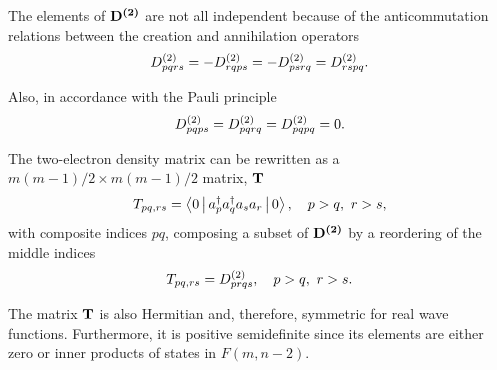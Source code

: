 The elements of $ \boldsymbol{\mathrm{D^{\left( 2 \right)}}}$ are not all independent because of the
anticommutation relations between the creation and annihilation operators 
\begin{equation}
    D^{\left( 2 \right)}_{pqrs} = - D^{\left( 2 \right)}_{rqps} = - D^{\left( 2 \right)}_{ps rq} = D^{\left( 2 \right)}_{rspq}
    .
\end{equation}

Also, in accordance with the Pauli principle 
\begin{equation}
    D^{\left( 2 \right)}_{pqps} = D^{\left( 2 \right)}_{pqrq} = D^{\left( 2 \right)}_{pqpq} = 0
    .
\end{equation}

The two-electron density matrix can be rewritten as a
$m\left( m-1 \right) /2 \times m\left( m-1 \right) /2$ 
matrix, $ \boldsymbol{\mathrm{T}}$ 
\begin{equation}
    T_{pq,rs} = \Braket{0 | a_p^{\dagger} a_q^{\dagger} a_s a_r | 0}
    , \quad
    p>q,\ r>s
    ,
\end{equation}
with composite indices $pq$, composing a subset of $ \boldsymbol{\mathrm{D^{\left( 2 \right)}}}$ by a
reordering of the middle indices 
\begin{equation}
    T_{pq,rs} = D^{\left( 2 \right)}_{prqs}
    , \quad
    p>q,\ r>s
    .
\end{equation}

The matrix $ \boldsymbol{\mathrm{T}}$ is also Hermitian and, therefore, symmetric for real
wave functions.
Furthermore, it is positive semidefinite since its elements are either zero
or inner products of states in $F\left( m, n-2 \right)$.

